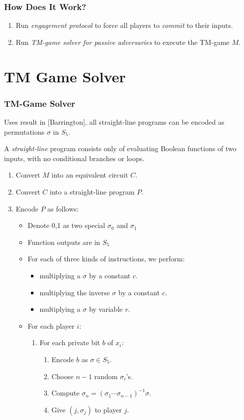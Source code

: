 \documentclass[10pt]{beamer}
\begin{document}
\begin{frame}
\begin{frame}
\frametitle{How Does It Work?}

\begin{enumerate}
\item Run \textit{engagement protocol} to force all players to \textit{commit}
to their inputs.
\item Run \textit{TM-game solver for passive adversaries} to execute the
TM-game $M$.
\end{enumerate}

\end{frame}

\section{TM Game Solver}

\begin{frame}
\frametitle{TM-Game Solver}

Uses result in [Barrington], all straight-line programs can be encoded as
permutations $\sigma$ in $S_5$.

A \textit{straight-line} program consists only of evaluating
Boolean functions of two inputs, with no conditional branches or loops.

\begin{enumerate}
\item Convert $M$ into an equivalent circuit $C$.
\item Convert $C$ into a straight-line program $P$.
\item Encode $P$ as follows:
\begin{itemize}
\item Denote 0,1 as two special $\sigma_0$ and $\sigma_1$
\item Function outputs are in $S_5$
\item For each of three kinds of instructions, we perform:
\begin{itemize}
\item multiplying a $\sigma$ by a constant $c$.
\item multiplying the inverse $\sigma$ by a constant $c$.
\item multiplying a $\sigma$ by variable $r$.
\end{itemize}
\item For each player $i$:
\begin{enumerate}
\item For each private bit $b$ of $x_i$:
\begin{enumerate}
\item Encode $b$ as $\sigma \in S_5$.
\item Choose $n-1$ random $\sigma_i$'s.
\item Compute $\sigma_n = (\sigma_1\cdots \sigma_{n-1})^{-1}\sigma$.
\item Give $(j,\sigma_j)$ to player $j$.
\end{enumerate}
\end{enumerate}


\end{itemize}
\end{enumerate}
\end{frame}
\end{frame}
\end{document}
